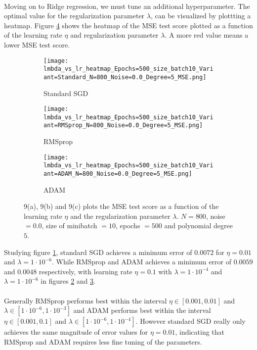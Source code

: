 \documentclass[a4paper,twocolumn]{article}
\begin{document}
\\
Moving on to Ridge regression, we must tune an additional hyperparameter. The optimal value for the regularization parameter $\lambda$, can be visualized by plottting a heatmap. Figure \ref{fig:9} shows the heatmap of the MSE test score plotted as a function of the learning rate $\eta$ and regularization parameter $\lambda$. A more red value means a lower MSE test score.
\begin{figure}[!ht]
    \centering
    \begin{subfigure}[b]{0.9\columnwidth}
        \texttt{[image: lmbda\_vs\_lr\_heatmap\_Epochs=500\_size\_batch10\_Variant=Standard\_N=800\_Noise=0.0\_Degree=5\_MSE.png]}
        \caption{Standard SGD}
        \label{fig:9a}
    \end{subfigure}
    
    \begin{subfigure}[b]{0.9\columnwidth}
        \texttt{[image: lmbda\_vs\_lr\_heatmap\_Epochs=500\_size\_batch10\_Variant=RMSprop\_N=800\_Noise=0.0\_Degree=5\_MSE.png]}
        \caption{RMSprop}
        \label{fig:9b}
    \end{subfigure}
    
    \begin{subfigure}[b]{0.9\columnwidth}
        \texttt{[image: lmbda\_vs\_lr\_heatmap\_Epochs=500\_size\_batch10\_Variant=ADAM\_N=800\_Noise=0.0\_Degree=5\_MSE.png]}
        \caption{ADAM}
        \label{fig:9c}
    \end{subfigure}
    \caption{9(a), 9(b) and 9(c) plots the MSE test score as a function of the learning rate $\eta$ and the regularization parameter $\lambda$. $N=800$, noise $= 0.0$, size of minibatch $= 10$, epochs $= 500$ and polynomial degree $5$.}
    \label{fig:9}
\end{figure}
\newpage
\noindent Studying figure \ref{fig:9a}, standard SGD achieves a minimum error of $0.0072$ for $\eta = 0.01$ and $\lambda = 1\cdot10^{-6}$. While RMSprop and ADAM achieves a minimum error of $0.0059$ and $0.0048$ respectively, with learning rate $\eta = 0.1$ with $\lambda = 1\cdot10^{-4}$ and $\lambda = 1\cdot10^{-6}$ in figures \ref{fig:9b} and \ref{fig:9c}.\\
\\
Generally RMSprop performs best within the interval $\eta \in [0.001, 0.01]$ and $\lambda \in [1\cdot10^{-6}, 1\cdot10^{-3}]$ and ADAM performs best within the interval $\eta \in [0.001, 0.1]$ and $\lambda \in [1\cdot10^{-6}, 1\cdot10^{-4}]$. However standard SGD really only achieves the same magnitude of error values for $\eta = 0.01$, indicating that RMSprop and ADAM requires less fine tuning of the parameters.\\
\end{document}
